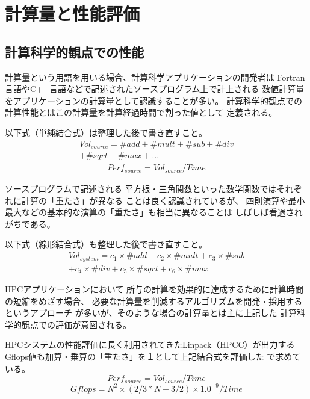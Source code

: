 \documentclass[submit,techrep,noauthor]{ipsj}
\begin{document}
\section {計算量と性能評価}

\subsection {計算科学的観点での性能}
\label{subsection:scientific-perf}
計算量という用語を用いる場合、計算科学アプリケーションの開発者は
Fortran言語やC++言語などで記述されたソースプログラム上で計上される
数値計算量をアプリケーションの計算量として認識することが多い。
計算科学的観点での計算性能とはこの計算量を計算経過時間で割った値として
定義される。

{ \color{blue}
以下式（単純結合式）は整理した後で書き直すこと。
}
\begin{align*}
Vol_{source} = \#add + \#mult + \#sub + \#div \\
	+ \#sqrt + \#max + ...
\end{align*}
\begin{align*}
Perf_{source} = Vol_{source} / Time	%
\end{align*}

ソースプログラムで記述される
平方根・三角関数といった数学関数ではそれぞれに計算の「重たさ」が異なる
ことは良く認識されているが、
四則演算や最小最大などの基本的な演算の「重たさ」も相当に異なることは
しばしば看過されがちである。

{ \color{blue}
以下式（線形結合式）も整理した後で書き直すこと。
}
\begin{align*}
Vol_{system} =
	c_{1}\times \#add + c_{2}\times \#mult + c_{3}\times \#sub \\
	+ c_{4}\times \#div + c_{5}\times \#sqrt + c_{6}\times \#max
\end{align*}

HPCアプリケーションにおいて
所与の計算を効果的に達成するために計算時間の短縮をめざす場合、
必要な計算量を削減するアルゴリズムを開発・採用するというアプローチ
が多いが、そのような場合の計算量とは主に上記した
計算科学的観点での評価が意図される。

HPCシステムの性能評価に長く利用されてきたLinpack（HPCC）が出力する
Gflops値も加算・乗算の「重たさ」を１として上記結合式を評価した
で求めている。
\[
Perf_{source} = Vol_{source} / Time
\]
\[
Gflops = N^{2} \times ( 2/3 * N + 3/2 ) \times 1.0^{-9} / Time 
\]
\end{document}
